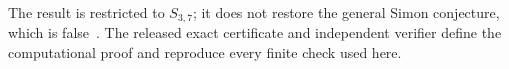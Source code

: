 \documentclass[11pt]{article}
\begin{document}
The result is restricted to $S_{3,7}$; it does not restore the general
Simon conjecture, which is false~\cite{BologniniSentinelli2026}.  The
released exact certificate and independent verifier define the
computational proof and reproduce every finite check used here.



\end{document}
